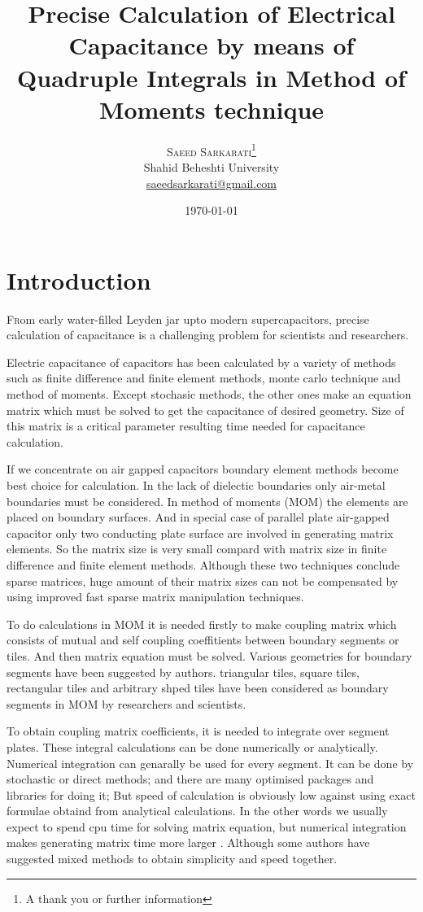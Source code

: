 \documentclass[twoside,twocolumn]{article}
\title{Precise Calculation of Electrical Capacitance by means of Quadruple Integrals in  Method of Moments technique} %
\author{%
\textsc{Saeed Sarkarati}\thanks{A thank you or further information} \\[1ex] %
\normalsize Shahid Beheshti University \\ %
\normalsize \href{mailto:saeedsarkarati@gmail.com}{saeedsarkarati@gmail.com} %
}
\date{\today} %
\begin{document}
\maketitle


\section{Introduction}

\lettrine[nindent=0em,lines=3]{F} rom early  water-filled Leyden jar upto modern supercapacitors, precise calculation of capacitance is a challenging problem for scientists and researchers.

Electric capacitance of capacitors has been calculated by a variety of methods such as finite difference and finite element methods, monte carlo technique and method of moments. Except stochasic methods, the other ones make an equation matrix which must be solved to get the capacitance of desired geometry. Size of this matrix is a critical parameter resulting time needed for capacitance calculation.

If we concentrate on air gapped capacitors boundary element methods become best choice for calculation. In the lack of dielectic boundaries only air-metal boundaries must be considered. In method of moments (MOM) the elements are placed on boundary surfaces. And in special case of parallel plate air-gapped capacitor only two conducting plate surface are involved in generating matrix elements. So the matrix size is very small compard with matrix size in finite difference and finite element methods. Although these two techniques conclude sparse matrices, huge amount of their matrix sizes can not be compensated by using improved fast sparse matrix manipulation techniques. 

To do calculations in MOM it is needed firstly to make coupling matrix which consists of mutual and self coupling coeffitients between boundary segments or tiles. And then matrix equation must be solved. Various geometries for boundary segments have been suggested by authors. triangular tiles, square tiles, rectangular tiles and arbitrary shped tiles have been considered as boundary segments in MOM by researchers and scientists. 

To obtain coupling matrix coefficients, it is needed to integrate over segment plates. These integral calculations can be done numerically or analytically. Numerical integration can genarally be used for every segment. It can be done by stochastic or direct methods; and there are many optimised packages and libraries for doing it; But speed of calculation is obviously low against %
using exact formulae obtaind from analytical calculations. In the other words we usually expect to spend cpu time for solving matrix equation, but numerical integration makes generating matrix time more larger %
. Although some authors have suggested mixed methods to obtain simplicity and speed together.
\end{document}
